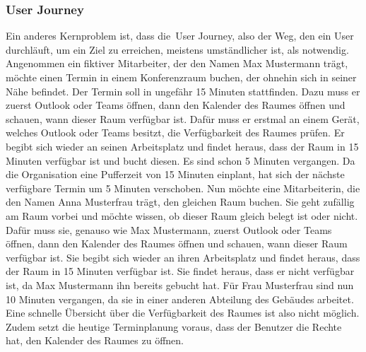 \subsubsection{User Journey}
Ein anderes Kernproblem ist, dass die~\gls{User Journey}, also der Weg, den ein User durchläuft, um ein Ziel zu erreichen, meistens umständlicher ist, als notwendig.
\newline
\newline
Angenommen ein fiktiver Mitarbeiter, der den Namen Max Mustermann trägt, möchte einen Termin in einem Konferenzraum buchen, der ohnehin sich in seiner Nähe befindet.
Der Termin soll in ungefähr 15 Minuten stattfinden.
Dazu muss er zuerst Outlook oder Teams öffnen, dann den Kalender des Raumes öffnen und schauen, wann dieser Raum verfügbar ist.
Dafür muss er erstmal an einem Gerät, welches Outlook oder Teams besitzt, die Verfügbarkeit des Raumes prüfen.
Er begibt sich wieder an seinen Arbeitsplatz und findet heraus, dass der Raum in 15 Minuten verfügbar ist und bucht diesen.
Es sind schon 5 Minuten vergangen.
Da die Organisation eine Pufferzeit von 15 Minuten einplant, hat sich der nächste verfügbare Termin um 5 Minuten verschoben.
\newline
Nun möchte eine Mitarbeiterin, die den Namen Anna Musterfrau trägt, den gleichen Raum buchen.
Sie geht zufällig am Raum vorbei und möchte wissen, ob dieser Raum gleich belegt ist oder nicht.
Dafür muss sie, genauso wie Max Mustermann, zuerst Outlook oder Teams öffnen, dann den Kalender des Raumes öffnen und schauen, wann dieser Raum verfügbar ist.
Sie begibt sich wieder an ihren Arbeitsplatz und findet heraus, dass der Raum in 15 Minuten verfügbar ist.
Sie findet heraus, dass er nicht verfügbar ist, da Max Mustermann ihn bereits gebucht hat.
Für Frau Musterfrau sind nun 10 Minuten vergangen, da sie in einer anderen Abteilung des Gebäudes arbeitet.
\newline
\newline
Eine schnelle Übersicht über die Verfügbarkeit des Raumes ist also nicht möglich.
Zudem setzt die heutige Terminplanung voraus, dass der Benutzer die Rechte hat, den Kalender des Raumes zu öffnen.

